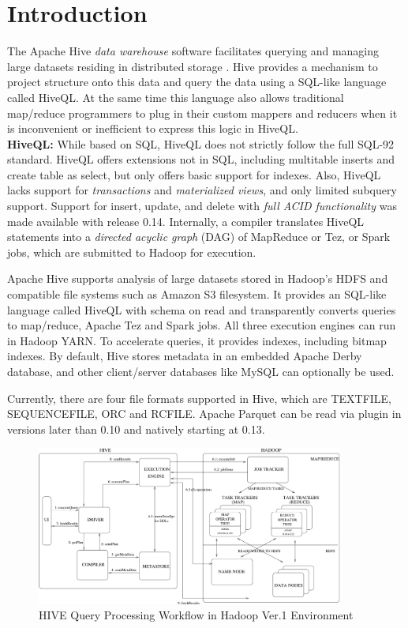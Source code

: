 \documentclass[twocolumn]{article}
\begin{document}
\section{Introduction}

The Apache Hive \textit{data warehouse} software facilitates querying and managing large datasets residing in distributed storage \cite{Thusoo:2010}. Hive provides a mechanism to project structure onto this data and query the data using a SQL-like language called HiveQL. At the same time this language also allows traditional map/reduce programmers to plug in their custom mappers and reducers when it is inconvenient or inefficient to express this logic in HiveQL.\\

\noindent
\textbf{HiveQL:} While based on SQL, HiveQL does not strictly follow the full SQL-92 standard. HiveQL offers extensions not in SQL, including multitable inserts and create table as select, but only offers basic support for indexes. Also, HiveQL lacks support for \textit{transactions} and \textit{materialized views}, and only limited subquery support. Support for insert, update, and delete with \textit{full ACID functionality} was made available with release 0.14.
Internally, a compiler translates HiveQL statements into a \textit{directed acyclic graph} (DAG) of MapReduce or Tez, or Spark jobs, which are submitted to Hadoop for execution.

Apache Hive supports analysis of large datasets stored in Hadoop's HDFS and compatible file systems such as Amazon S3 filesystem. It provides an SQL-like language called HiveQL with schema on read and transparently converts queries to map/reduce, Apache Tez and Spark jobs. All three execution engines can run in Hadoop YARN. To accelerate queries, it provides indexes, including bitmap indexes.
By default, Hive stores metadata in an embedded Apache Derby database, and other client/server databases like MySQL can optionally be used.

Currently, there are four file formats supported in Hive, which are TEXTFILE, SEQUENCEFILE, ORC and RCFILE.
Apache Parquet can be read via plugin in versions later than 0.10 and natively starting at 0.13.

\begin{figure}[htb]
        \centering
        \includegraphics[width=0.9\textwidth]{system_architecture.png}
        \caption{HIVE Query Processing Workflow in Hadoop Ver.1 Environment}
        \label{fig01}
\end{figure}
\end{document}
